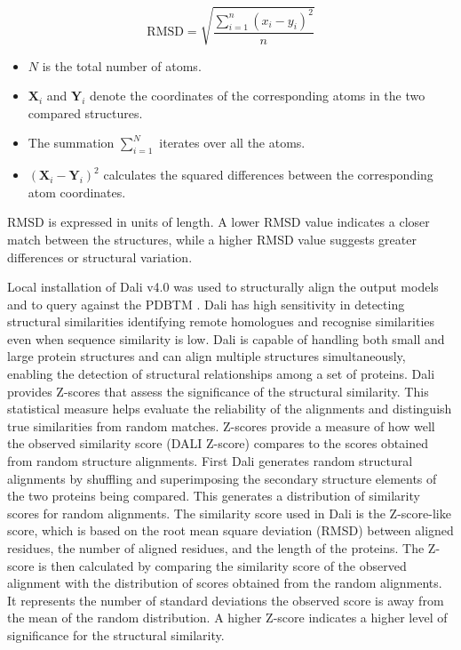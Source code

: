 \[ \text{RMSD} = \sqrt{\frac{\sum\limits_{i=1}^{n}(x_i - y_i)^2}{n}} \]

\begin{itemize}
\item  \(N\) is the total number of atoms.
\item  \(\mathbf{X}_i\) and \(\mathbf{Y}_i\) denote the coordinates of the corresponding atoms in the two compared structures.
\item  The summation \(\sum_{i=1}^{N}\) iterates over all the atoms.
\item  \((\mathbf{X}_i - \mathbf{Y}_i)^2\) calculates the squared differences between the corresponding atom coordinates.
\end{itemize}
RMSD is expressed in units of length. A lower RMSD value indicates a closer match between the structures, while a higher RMSD value suggests greater differences or structural variation.

Local installation of Dali v4.0 \cite{Holm2016} was used to structurally align the output models and to query against the PDBTM \cite{Kozma2012}.  Dali has high sensitivity in detecting structural similarities identifying remote homologues and recognise similarities even when sequence similarity is low.  Dali is capable of handling both small and large protein structures and can align multiple structures simultaneously, enabling the detection of structural relationships among a set of proteins.  Dali provides Z-scores that assess the significance of the structural similarity. This statistical measure helps evaluate the reliability of the alignments and distinguish true similarities from random matches. Z-scores provide a measure of how well the observed similarity score (DALI Z-score) compares to the scores obtained from random structure alignments.  First Dali generates random structural alignments by shuffling and superimposing the secondary structure elements of the two proteins being compared. This generates a distribution of similarity scores for random alignments.  The similarity score used in Dali is the Z-score-like score, which is based on the root mean square deviation (RMSD) between aligned residues, the number of aligned residues, and the length of the proteins. The Z-score is then calculated by comparing the similarity score of the observed alignment with the distribution of scores obtained from the random alignments. It represents the number of standard deviations the observed score is away from the mean of the random distribution. A higher Z-score indicates a higher level of significance for the structural similarity.


